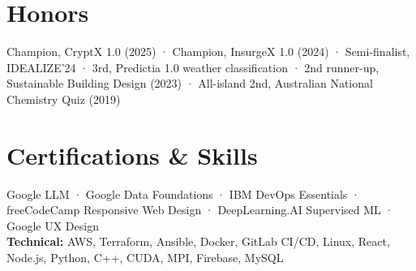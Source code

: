 \documentclass[10pt,a4paper]{article}
\begin{document}
\section*{Honors}
Champion, CryptX 1.0 (2025) · Champion, InsurgeX 1.0 (2024) · Semi-finalist, IDEALIZE'24 · 3rd, Predictia 1.0 weather classification · 2nd runner-up, Sustainable Building Design (2023) · All-island 2nd, Australian National Chemistry Quiz (2019)
\section*{Certifications \& Skills}
Google LLM · Google Data Foundations · IBM DevOps Essentials · freeCodeCamp Responsive Web Design · DeepLearning.AI Supervised ML · Google UX Design\\
\textbf{Technical:} AWS, Terraform, Ansible, Docker, GitLab CI/CD, Linux, React, Node.js, Python, C++, CUDA, MPI, Firebase, MySQL
\end{document}
